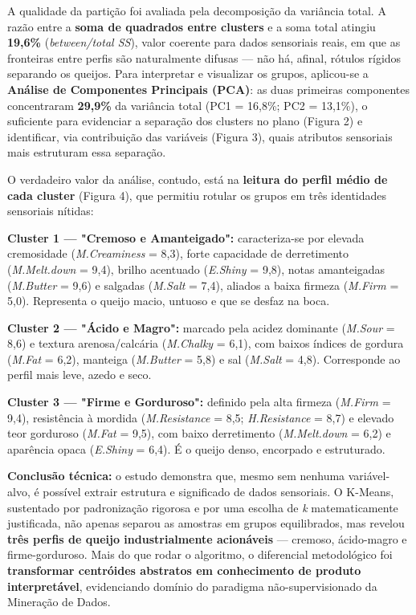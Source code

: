 \documentclass[11pt,a4paper]{article}
\begin{document}
A qualidade da partição foi avaliada pela decomposição da variância total. A razão entre a \textbf{soma de quadrados entre clusters} e a soma total atingiu \textbf{19,6\%} (\textit{between/total SS}), valor coerente para dados sensoriais reais, em que as fronteiras entre perfis são naturalmente difusas --- não há, afinal, rótulos rígidos separando os queijos. Para interpretar e visualizar os grupos, aplicou-se a \textbf{Análise de Componentes Principais (PCA)}: as duas primeiras componentes concentraram \textbf{29,9\%} da variância total (PC1 = 16,8\%; PC2 = 13,1\%), o suficiente para evidenciar a separação dos clusters no plano (Figura 2) e identificar, via contribuição das variáveis (Figura 3), quais atributos sensoriais mais estruturam essa separação.

O verdadeiro valor da análise, contudo, está na \textbf{leitura do perfil médio de cada cluster} (Figura 4), que permitiu rotular os grupos em três identidades sensoriais nítidas:

\textbf{Cluster 1 --- "Cremoso e Amanteigado":} caracteriza-se por elevada cremosidade (\textit{M.Creaminess} = 8,3), forte capacidade de derretimento (\textit{M.Melt.down} = 9,4), brilho acentuado (\textit{E.Shiny} = 9,8), notas amanteigadas (\textit{M.Butter} = 9,6) e salgadas (\textit{M.Salt} = 7,4), aliados a baixa firmeza (\textit{M.Firm} = 5,0). Representa o queijo macio, untuoso e que se desfaz na boca.

\textbf{Cluster 2 --- "Ácido e Magro":} marcado pela acidez dominante (\textit{M.Sour} = 8,6) e textura arenosa/calcária (\textit{M.Chalky} = 6,1), com baixos índices de gordura (\textit{M.Fat} = 6,2), manteiga (\textit{M.Butter} = 5,8) e sal (\textit{M.Salt} = 4,8). Corresponde ao perfil mais leve, azedo e seco.

\textbf{Cluster 3 --- "Firme e Gorduroso":} definido pela alta firmeza (\textit{M.Firm} = 9,4), resistência à mordida (\textit{M.Resistance} = 8,5; \textit{H.Resistance} = 8,7) e elevado teor gorduroso (\textit{M.Fat} = 9,5), com baixo derretimento (\textit{M.Melt.down} = 6,2) e aparência opaca (\textit{E.Shiny} = 6,4). É o queijo denso, encorpado e estruturado.

\textbf{Conclusão técnica:} o estudo demonstra que, mesmo sem nenhuma variável-alvo, é possível extrair estrutura e significado de dados sensoriais. O K-Means, sustentado por padronização rigorosa e por uma escolha de \textit{k} matematicamente justificada, não apenas separou as amostras em grupos equilibrados, mas revelou \textbf{três perfis de queijo industrialmente acionáveis} --- cremoso, ácido-magro e firme-gorduroso. Mais do que rodar o algoritmo, o diferencial metodológico foi \textbf{transformar centróides abstratos em conhecimento de produto interpretável}, evidenciando domínio do paradigma não-supervisionado da Mineração de Dados.
\end{document}
